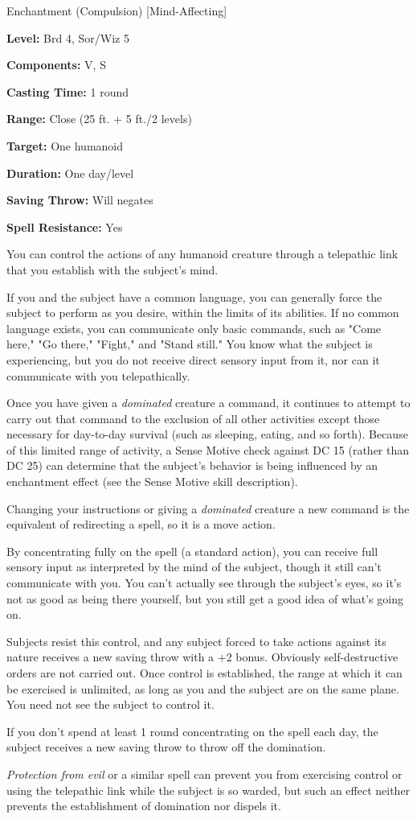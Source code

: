 
Enchantment (Compulsion) [Mind-Affecting]

\textbf{Level:} Brd 4, Sor/Wiz 5

\textbf{Components:} V, S

\textbf{Casting Time:} 1 round

\textbf{Range:} Close (25 ft. + 5 ft./2 levels)

\textbf{Target:} One humanoid

\textbf{Duration:} One day/level

\textbf{Saving Throw:} Will negates

\textbf{Spell Resistance:} Yes

You can control the actions of any humanoid creature through a telepathic link 
that you establish with the subject's mind.

If you and the subject have a common language, you can generally force the subject 
to perform as you desire, within the limits of its abilities. If no common language 
exists, you can communicate only basic commands, such as "Come here," "Go there," 
"Fight," and "Stand still." You know what the subject is experiencing, but 
you do not receive direct sensory input from it, nor can it communicate with you 
telepathically.

Once you have given a \textit{dominated} creature a command, it continues to attempt 
to carry out that command to the exclusion of all other activities except those 
necessary for day-to-day survival (such as sleeping, eating, and so forth). Because 
of this limited range of activity, a Sense Motive check against DC 15 (rather than 
DC 25) can determine that the subject's behavior is being influenced by an enchantment 
effect (see the Sense Motive skill description).

Changing your instructions or giving a \textit{dominated} creature a new command 
is the equivalent of redirecting a spell, so it is a move action.

By concentrating fully on the spell (a standard action), you can receive full sensory 
input as interpreted by the mind of the subject, though it still can't communicate 
with you. You can't actually see through the subject's eyes, so it's not as good 
as being there yourself, but you still get a good idea of what's going on.

Subjects resist this control, and any subject forced to take actions against its 
nature receives a new saving throw with a +2 bonus. Obviously self-destructive 
orders are not carried out. Once control is established, the range at which it 
can be exercised is unlimited, as long as you and the subject are on the same plane. 
You need not see the subject to control it.

If you don't spend at least 1 round concentrating on the spell each day, the subject 
receives a new saving throw to throw off the domination.

\textit{Protection from evil} or a similar spell can prevent you from exercising 
control or using the telepathic link while the subject is so warded, but such an 
effect neither prevents the establishment of domination nor dispels it.

